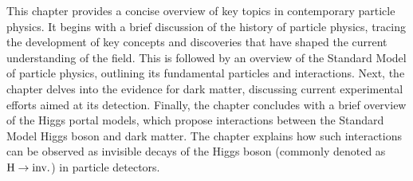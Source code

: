
This chapter provides a concise overview of key topics in contemporary particle physics. 
It begins with a brief discussion of the history of particle physics, 
tracing the development of key concepts and discoveries that have shaped 
the current understanding of the field. This is followed by an overview 
of the Standard Model of particle physics, 
outlining its fundamental particles and interactions. 
Next, the chapter delves into the evidence for dark matter, 
discussing current experimental efforts aimed at its detection. 
Finally, the chapter concludes with a brief overview of the Higgs portal models, 
which propose interactions between the Standard Model Higgs boson and 
dark matter. The chapter explains how such interactions can be observed 
as invisible decays of the Higgs boson (commonly denoted as $\textrm{H} \rightarrow \textrm{inv.}$) in particle detectors.

\finishchapterabstract






